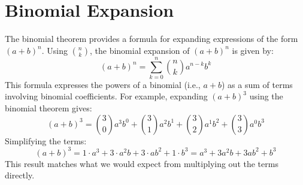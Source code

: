 \documentclass[12pt]{article}
\begin{document}
\section{Binomial Expansion}
The binomial theorem provides a formula for expanding expressions of the form \( (a + b)^n \). Using \( n \choose k \), the binomial expansion of \( (a + b)^n \) is given by:
\[
(a + b)^n = \sum_{k=0}^{n} \binom{n}{k} a^{n-k} b^k
\]
This formula expresses the powers of a binomial (i.e., \( a + b \)) as a sum of terms involving binomial coefficients. For example, expanding \( (a + b)^3 \) using the binomial theorem gives:
\[
(a + b)^3 = \binom{3}{0} a^3 b^0 + \binom{3}{1} a^2 b^1 + \binom{3}{2} a^1 b^2 + \binom{3}{3} a^0 b^3
\]
Simplifying the terms:
\[
(a + b)^3 = 1 \cdot a^3 + 3 \cdot a^2b + 3 \cdot ab^2 + 1 \cdot b^3 = a^3 + 3a^2b + 3ab^2 + b^3
\]
This result matches what we would expect from multiplying out the terms directly.
\end{document}

